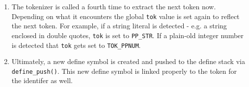 \begin{enumerate}
\item The tokenizer is called a fourth time to extract the next token now. Depending on what it encounters the global \verb|tok| value is set again to reflect the next token. For example, if a string literal is detected - e.g. a string enclosed in double quotes, \verb|tok| is set to \verb|PP_STR|. If a plain-old integer number is detected that \verb|tok| gets set to \verb|TOK_PPNUM|.

\item Ultimately, a new define symbol is created and pushed to the define stack via \verb|define_push()|. This new define symbol is linked properly to the token for the identifer as well.


\end{enumerate}






%
% 





